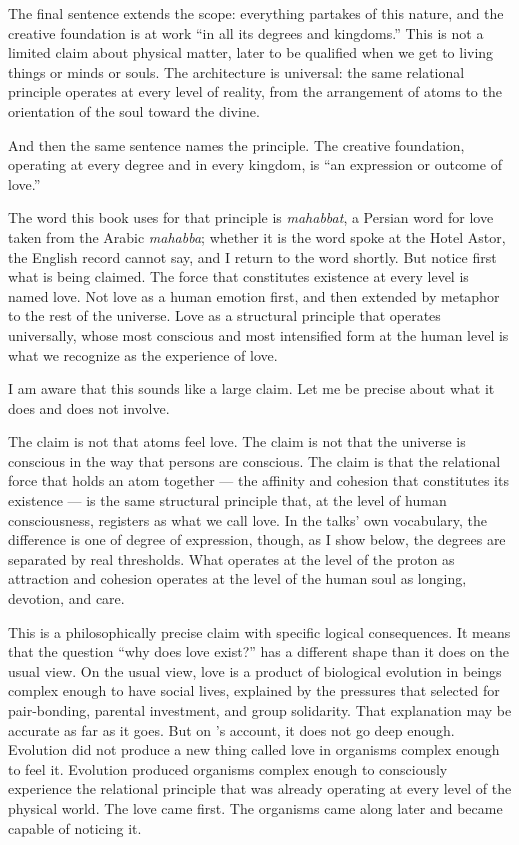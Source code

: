 The final sentence extends the scope: everything partakes of this nature,
and the creative foundation is at work ``in all its degrees and kingdoms.''
This is not a limited claim about physical matter, later to be qualified
when we get to living things or minds or souls.
The architecture is universal: the same relational principle operates at
every level of reality, from the arrangement of atoms to the orientation
of the soul toward the divine.

And then the same sentence names the principle.
The creative foundation, operating at every degree and in every kingdom, is
``an expression or outcome of love.''

The word this book uses for that principle is \textit{mahabbat}, a Persian
word for love taken from the Arabic \textit{mahabba}; whether it is the word
\AbdulBaha spoke at the Hotel Astor, the English record cannot say, and I
return to the word shortly.
But notice first what is being claimed.
The force that constitutes existence at every level is named love.
Not love as a human emotion first, and then extended by metaphor to the
rest of the universe.
Love as a structural principle that operates universally, whose most
conscious and most intensified form at the human level is what we
recognize as the experience of love.

I am aware that this sounds like a large claim.
Let me be precise about what it does and does not involve.

The claim is not that atoms feel love.
The claim is not that the universe is conscious in the way that persons
are conscious.
The claim is that the relational force that holds an atom together ---
the affinity and cohesion that constitutes its existence --- is the same
structural principle that, at the level of human consciousness, registers
as what we call love.
In the talks' own vocabulary, the difference is one of degree of expression,
though, as I show below, the degrees are separated by real thresholds.
What operates at the level of the proton as attraction and cohesion
operates at the level of the human soul as longing, devotion, and care.

This is a philosophically precise claim with specific logical consequences.
It means that the question ``why does love exist?'' has a different shape
than it does on the usual view.
On the usual view, love is a product of biological evolution in beings
complex enough to have social lives, explained by the pressures that selected
for pair-bonding, parental investment, and group solidarity.
That explanation may be accurate as far as it goes.
But on \AbdulBaha's account, it does not go deep enough.
Evolution did not produce a new thing called love in organisms complex
enough to feel it.
Evolution produced organisms complex enough to consciously experience the
relational principle that was already operating at every level of the physical
world.
The love came first.
The organisms came along later and became capable of noticing it.

